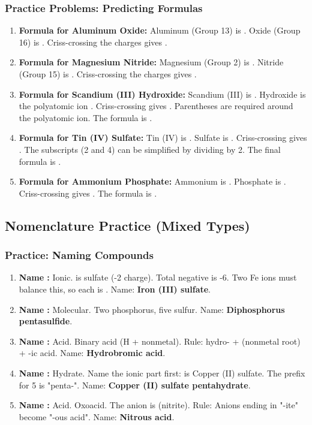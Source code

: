 \documentclass{article}
\begin{document}
\subsubsection*{Practice Problems: Predicting Formulas}
\begin{enumerate}[itemsep=5pt]
    \item \textbf{Formula for Aluminum Oxide:} Aluminum (Group 13) is . Oxide (Group 16) is . Criss-crossing the charges gives \textbf{}.
    \item \textbf{Formula for Magnesium Nitride:} Magnesium (Group 2) is . Nitride (Group 15) is . Criss-crossing the charges gives \textbf{}.
    \item \textbf{Formula for Scandium (III) Hydroxide:} Scandium (III) is . Hydroxide is the polyatomic ion . Criss-crossing gives . Parentheses are required around the polyatomic ion. The formula is \textbf{}.
    \item \textbf{Formula for Tin (IV) Sulfate:} Tin (IV) is . Sulfate is . Criss-crossing gives . The subscripts (2 and 4) can be simplified by dividing by 2. The final formula is \textbf{}.
    \item \textbf{Formula for Ammonium Phosphate:} Ammonium is . Phosphate is . Criss-crossing gives . The formula is \textbf{}.
\end{enumerate}

\subsection*{Nomenclature Practice (Mixed Types)}
\subsubsection*{Practice: Naming Compounds}
\begin{enumerate}[itemsep=5pt]
    \item \textbf{Name :} Ionic.  is sulfate (-2 charge). Total negative is -6. Two Fe ions must balance this, so each is . Name: \textbf{Iron (III) sulfate}.
    \item \textbf{Name :} Molecular. Two phosphorus, five sulfur. Name: \textbf{Diphosphorus pentasulfide}.
    \item \textbf{Name :} Acid. Binary acid (H + nonmetal). Rule: hydro- + (nonmetal root) + -ic acid. Name: \textbf{Hydrobromic acid}.
    \item \textbf{Name :} Hydrate. Name the ionic part first:  is Copper (II) sulfate. The prefix for 5 is "penta-". Name: \textbf{Copper (II) sulfate pentahydrate}.
    \item \textbf{Name :} Acid. Oxoacid. The anion is  (nitrite). Rule: Anions ending in "-ite" become "-ous acid". Name: \textbf{Nitrous acid}.
\end{enumerate}
\end{document}
